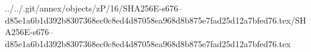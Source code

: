 ../../.git/annex/objects/zP/16/SHA256E-s676--d85e1a6b1d392b8307368ec0c8ed4d87058ea968d8b875e7fad25d12a7bfed76.tex/SHA256E-s676--d85e1a6b1d392b8307368ec0c8ed4d87058ea968d8b875e7fad25d12a7bfed76.tex
